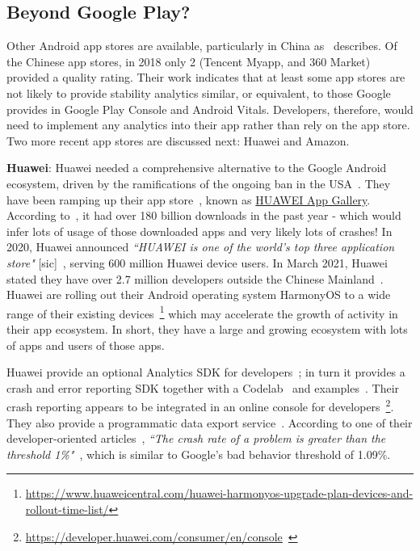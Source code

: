 \subsection{Beyond Google Play?}
Other Android app stores are available, particularly in China as~\citep{wang2018_beyond_google_play} describes. Of the Chinese app stores, in 2018 only 2 (Tencent Myapp, and 360 Market) provided a quality rating. Their work indicates that at least some app stores are not likely to provide stability analytics similar, or equivalent, to those Google provides in Google Play Console and Android Vitals. Developers, therefore, would need to implement any analytics into their app rather than rely on the app store. Two more recent app stores are discussed next: Huawei and Amazon.

\textbf{Huawei}: 
Huawei needed a comprehensive alternative to the Google Android ecosystem, driven by the ramifications of the ongoing ban in the USA~\citep{androidauthority2021_the_huawei_ban}. 
They have been ramping up their app store~\citep{androidauthority2021_huawei_app_gallery}, known as \href{https://appgallery.huawei.com/}{HUAWEI App Gallery}. According to~\citep{vodafone2021_huawei_appgallery}, it had over 180 billion downloads in the past year - which would infer lots of usage of those downloaded apps and very likely lots of crashes! 
%
In 2020, Huawei announced \emph{``HUAWEI is one of the world's top three application store"} [sic]~\citep{huawei2020_press_release_on_hms_ecosystem}, serving 600 million Huawei device users. In March 2021, Huawei stated they have over 2.7 million developers outside the Chinese Mainland~\citep{}. 
Huawei are rolling out their Android operating system HarmonyOS to a wide range of their existing devices~\footnote{\url{https://www.huaweicentral.com/huawei-harmonyos-upgrade-plan-devices-and-rollout-time-list/}} which may accelerate the growth of activity in their app ecosystem. In short, they have a large and growing ecosystem with lots of apps and users of those apps.

Huawei provide an optional Analytics SDK for developers~\citep{huawei_analyticskit}; in turn it provides a crash and error reporting SDK together with a Codelab~\citep{huawei_crashservice_codelab} and examples~\citep{huawei_crashservice_github_examples}. Their crash reporting appears to be integrated in an online console for developers~\footnote{\url{https://developer.huawei.com/consumer/en/console}~\citep{huawei_introduction_to_appgallery_connect_crash_service}}. They also provide a programmatic data export service~\citep{huawei_analyticskit_dataexport_codelab}. According to one of their developer-oriented articles~\citep{huawei_introduction_to_appgallery_connect_crash_service}, \emph{``The crash rate of a problem is greater than the threshold 1\%"}~\citep{huawei_introduction_to_appgallery_connect_crash_service}, which is similar to Google's bad behavior threshold of 1.09\%.


